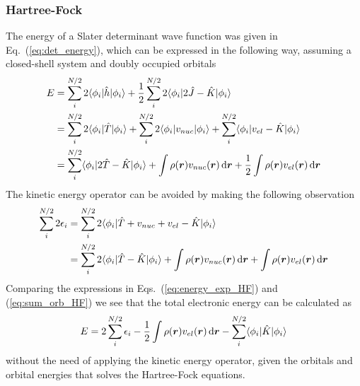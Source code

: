 \subsubsection{Hartree-Fock}
The energy of a Slater determinant wave function was given in Eq.~(\ref{eq:det_energy}), 
which can be expressed in the following way, assuming a closed-shell system and doubly
occupied orbitals
\begin{align}
    E	&= \sum_i^{N/2} 2\langle \phi_i|\hat{h}|\phi_i \rangle
	    + \frac{1}{2} \sum_i^{N/2} 2\langle \phi_i|2\hat{J} - \hat{K}|\phi_i \rangle\\
	&= \sum_i^{N/2} 2\langle \phi_i|\hat{T}|\phi_i \rangle
	    + \sum_i^{N/2} 2\langle \phi_i|v_{nuc}|\phi_i \rangle
	    + \sum_i^{N/2} \langle \phi_i|v_{el} - \hat{K}|\phi_i \rangle \\
    \label{eq:energy_exp_HF}
	&= \sum_i^{N/2} \langle \phi_i|2\hat{T} - \hat{K}|\phi_i \rangle
	    + \int \rho(\boldsymbol r)v_{nuc}(\boldsymbol r) \,\mathrm{d}\boldsymbol r
	    + \frac{1}{2} \int \rho(\boldsymbol r)v_{el}(\boldsymbol r) \,\mathrm{d}\boldsymbol r
\end{align}
The kinetic energy operator can be avoided by making the following observation
\begin{align}
    \sum_i^{N/2} 2 \epsilon_i 
	&= \sum_i^{N/2} 2\langle\phi_i|\hat{T}+v_{nuc}+v_{el}-\hat{K}|\phi_i\rangle\\
    \label{eq:sum_orb_HF}
	&= \sum_i^{N/2} 2\langle\phi_i|\hat{T} - \hat{K}|\phi_i\rangle
	    + \int \rho(\boldsymbol r)v_{nuc}(\boldsymbol r) \,\mathrm{d}\boldsymbol r
	    + \int \rho(\boldsymbol r)v_{el}(\boldsymbol r) \,\mathrm{d}\boldsymbol r
\end{align}
Comparing the expressions in Eqs.~(\ref{eq:energy_exp_HF}) and (\ref{eq:sum_orb_HF}) we see that
the total electronic energy can be calculated as
\begin{equation}
    E = 2 \sum_i^{N/2} \epsilon_i - \frac{1}{2} \int \rho(\boldsymbol r)v_{el}(\boldsymbol r) \,\mathrm{d}\boldsymbol r
	- \sum_i^{N/2} \langle\phi_i|\hat{K}|\phi_i\rangle
\end{equation}
without the need of applying the kinetic energy operator, given the orbitals and orbital energies
that solves the Hartree-Fock equations.

